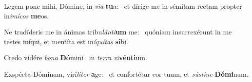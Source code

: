 \item Legem pone mihi, Dómine, in \textit{via} \textbf{tu}a:~\psstar{} et dírige me in sémitam rectam propter in\textit{imícos} \textbf{me}os.
\item Ne tradíderis me in ánimas tribu\textit{lánti}\textbf{um} me:~\psstar{} quóniam insurrexérunt in me testes iníqui, et mentíta est in\textit{íquitas} \textbf{si}bi.
\item Credo vidére \textit{bona} \textbf{Dó}mini~\psstar{} in \textit{terra} \textit{vi}\textbf{vén}\textbf{ti}um.
\item Exspécta Dóminum, virí\textit{liter} \textbf{a}ge:~\psstar{} et confortétur cor tuum, et \textit{sústine} \textbf{Dó}\textbf{mi}num.
